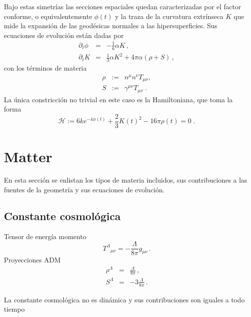 \documentclass[12pt,fleqn,b5paper]{article}
\begin{document}
Bajo estas simetrías las secciones espaciales quedan caracterizadas
por el factor conforme, o equivalentemente $\phi(t)$ y la traza de la
curvatura extrínseca $K$ que mide la expansión de las geodésicas
normales a las hipersuperficies. Sus ecuaciones de evolución están
dadas por
\begin{eqnarray}
  \partial_t \phi &=& - \frac{1}{6} \alpha K \,, \\
  \label{eq:sphere-chidot}
  \partial_t K &=&   \frac{1}{3}\alpha K^2                                                                                           
  + 4 \pi \alpha \left( \rho + S\right) \,, 
  \label{eq:sphere-Kdot}
\end{eqnarray}
con los términos de materia
\begin{eqnarray}
  \label{eq:matter}
  \rho&:=& n^\mu n^\nu T_{\mu\nu}, \\
  S&:=&\gamma^{\mu\nu}T_{\mu\nu}\;. 
\end{eqnarray}
La única constricción no trivial en este caso es la Hamiltoniana, que
toma la forma
\begin{equation}
  \label{eq:Ham}
  \mathcal{H}:= 6ke^{-4\phi(t)}+\frac{2}{3}K(t)^2 -16\pi\rho(t)=0\;.
\end{equation}

\setcounter{equation}{0}
\section{Matter}
\label{sec:matter}
En esta sección se enlistan los tipos de materia incluidos, sus
contribuciones a las fuentes de la geometría y sus ecuaciones de evolución.

\subsection{Constante cosmológica}
\label{sec:lambda}

Tensor de energía momento
\begin{equation}
  {T^\Lambda}_{\mu\nu} =  -\frac{\Lambda}{8\pi}g_{\mu\nu} \,.
\end{equation}
Proyecciones ADM
\begin{eqnarray}
  \label{eq:lambdaTmunu}
  \rho^\Lambda &=&  \frac{\Lambda}{8\pi}\,,\\
  S^\Lambda &=&  -3 \frac{\Lambda}{8\pi}\,.
\end{eqnarray}

La constante cosmológica no es dinámica y sus contribuciones son
iguales a todo tiempo
\end{document}
